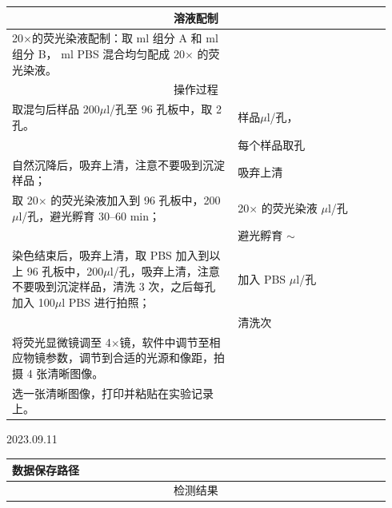 \documentclass[UTF8,10pt,a4paper,fontset=fandol]{ctexart}
\newcommand{\fieldvalue}[1]{#1}
\newcommand{\handwritten}[1]{#1}
\begin{document}
\begin{center}
\small
\begin{tabular}{|p{0.56\linewidth}|p{0.38\linewidth}|}
\hline
\multicolumn{2}{|c|}{溶液配制}\\
\hline
20$\times$的荧光染液配制：取\underline{\hspace{1.2cm}} ml 组分 A 和\underline{\hspace{1.2cm}} ml 组分 B，\underline{\hspace{1.2cm}} ml PBS 混合均匀配成 20$\times$ 的荧光染液。 & \\
\hline
\multicolumn{2}{|c|}{操作过程}\\
\hline
取混匀后样品 200$\mu$l/孔至 96 孔板中，取 2 孔。 &
样品\quad $\mu$l/孔，\\
& 每个样品取\underline{\hspace{1.2cm}}孔\\
\hline
自然沉降后，吸弃上清，注意不要吸到沉淀样品； &
吸弃上清\\
\hline
取 20$\times$ 的荧光染液加入到 96 孔板中，200$\mu$l/孔，避光孵育 30--60 min； &
20$\times$ 的荧光染液\underline{\hspace{1.2cm}} $\mu$l/孔\\
& 避光孵育\underline{\hspace{1.2cm}} $\sim$ \\
\hline
染色结束后，吸弃上清，取 PBS 加入到以上 96 孔板中，200$\mu$l/孔，吸弃上清，注意不要吸到沉淀样品，清洗 3 次，之后每孔加入 100$\mu$l PBS 进行拍照； &
加入 PBS\underline{\hspace{1.2cm}} $\mu$l/孔\\
& 清洗\underline{\hspace{1.2cm}}次\\
\hline
将荧光显微镜调至 4$\times$镜，软件中调节至相应物镜参数，调节到合适的光源和像距，拍摄 4 张清晰图像。 &
\\
\hline
选一张清晰图像，打印并粘贴在实验记录上。 &
\\
\hline
\end{tabular}
\end{center}

\fieldvalue{\handwritten{2023.09.11}}

\begin{center}
\begin{tabular}{|p{0.20\linewidth}|p{0.74\linewidth}|}
\hline
数据保存路径 & \\
\hline
\multicolumn{2}{|c|}{检测结果}\\
\hline
\end{tabular}
\end{center}
\end{document}
